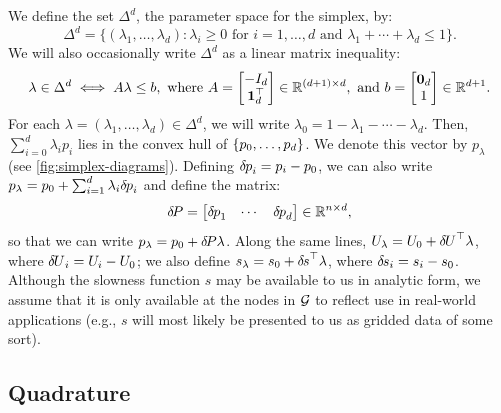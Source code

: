 \documentclass{article}
\begin{document}
We define the set $\Delta^d$, the parameter space for the simplex, by:
\begin{equation}\label{eq:Delta-set}
  \Delta^d = \big\{(\lambda_1, \hdots, \lambda_d) : \lambda_i \geq 0 \mbox{ for } i = 1, \hdots, d \mbox{ and } \lambda_1 + \cdots + \lambda_d \leq 1\big\}.
\end{equation}
We will also occasionally write $\Delta^d$ as a linear matrix inequality:
\begin{equation}\label{eq:Delta-LMI}
  \lambda \in \Delta^d \iff A\lambda \leq b, \mbox{ where } A = \begin{bmatrix}
    -I_d \\ \boldsymbol{1}_{d}^\top
  \end{bmatrix} \in \mathbb{R}^{(d + 1) \times d}, \mbox{ and } b
  = \begin{bmatrix} \boldsymbol{0}_{d} \\ 1 \end{bmatrix} \in \mathbb{R}^{d +
    1}.
\end{equation}
For each $\lambda = (\lambda_1, \hdots, \lambda_d) \in \Delta^d$, we
will write $\lambda_0 = 1 - \lambda_1 - \cdots - \lambda_d$. Then,
$\sum_{i=0}^d \lambda_i p_i$ lies in the convex hull of
$\left\{p_0, \hdots, p_d\right\}$. We denote this vector by $p_\lambda$ (see
\cref{fig:simplex-diagrams}). Defining ${\delta \hspace{-0.08em} p}_i = p_i - p_0$, we
can also write $p_\lambda = p_0 + \sum_{i=1}^d \lambda_i {\delta \hspace{-0.08em} p}_i$
and define the matrix:
\begin{equation}
  {\delta \hspace{-0.14em} P} = \begin{bmatrix} {\delta \hspace{-0.08em} p}_1 & \cdots & {\delta \hspace{-0.08em} p}_d \end{bmatrix} \in \mathbb{R}^{n \times d},
\end{equation}
so that we can write $p_\lambda = p_0 + {\delta \hspace{-0.14em} P} \lambda$. Along the same
lines, $U_\lambda = U_0 + {\delta \hspace{-0.09em} U}^\top \lambda$, where
${\delta \hspace{-0.09em} U}_i = U_i - U_0$; we also define
$s_\lambda = s_0 + {\delta \hspace{-0.1em} s}^\top \lambda$, where ${\delta \hspace{-0.1em} s}_i = s_i -
s_0$. Although the slowness function $s$ may be available to us in
analytic form, we assume that it is only available at the nodes in
$\mathcal{G}$ to reflect use in real-world applications (e.g., $s$ will most
likely be presented to us as gridded data of some sort).

\subsection{Quadrature}\label{ssec:quadrature}
\end{document}
